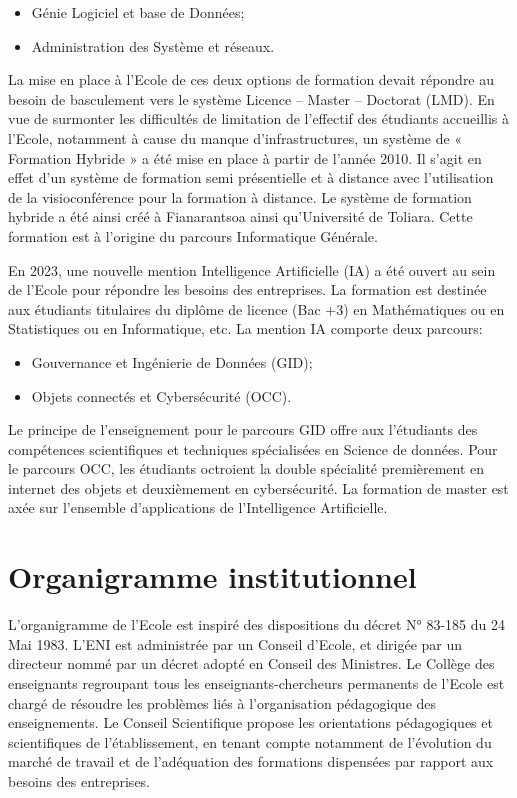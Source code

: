 \documentclass[12pt]{report}
\begin{document}
						\begin{itemize}
							\item Génie Logiciel et base de Données;
							\item Administration des Système et réseaux.
						\end{itemize}
				
				La mise en place à l’Ecole de ces deux options de formation devait répondre au besoin de basculement vers le système Licence – Master – Doctorat (LMD). 
En vue de surmonter les difficultés de limitation de l’effectif des étudiants accueillis à l’Ecole, notamment à cause du manque d’infrastructures, un système de « Formation Hybride » a été mise en place à partir de l’année 2010. Il s’agit en effet d’un système de formation semi présentielle et à distance avec l’utilisation de la visioconférence pour la formation à distance. Le système de formation hybride a été ainsi créé à Fianarantsoa ainsi qu’Université de Toliara. Cette formation est à l’origine du parcours Informatique Générale.

				En 2023, une nouvelle mention Intelligence Artificielle (IA) a été ouvert au sein de l’Ecole pour répondre les besoins des entreprises. La formation est destinée aux étudiants titulaires du diplôme de licence (Bac +3) en Mathématiques ou en Statistiques ou en Informatique, etc. La mention IA comporte deux parcours:

						\begin{itemize}
							\item Gouvernance et Ingénierie de Données (GID);
							\item Objets connectés et Cybersécurité (OCC).
						\end{itemize}

				Le principe de l’enseignement pour le parcours GID offre aux l’étudiants des compétences scientifiques et techniques spécialisées en Science de données. Pour le parcours OCC, les étudiants octroient la double spécialité premièrement en internet des objets et deuxièmement en cybersécurité. La formation de master est axée sur l’ensemble d’applications de l’Intelligence Artificielle.

				\section{Organigramme institutionnel}

				\hspace{15pt} L’organigramme de l’Ecole est inspiré des dispositions du décret N° 83-185 du 24 Mai 1983. L’ENI est administrée par un Conseil d’Ecole, et dirigée par un directeur nommé par un décret adopté en Conseil des Ministres. Le Collège des enseignants regroupant tous les enseignants-chercheurs permanents de l’Ecole est chargé de résoudre les problèmes liés à l’organisation pédagogique des enseignements. Le Conseil Scientifique propose les orientations pédagogiques et scientifiques de l’établissement, en tenant compte notamment de l’évolution du marché de travail et de l’adéquation des formations dispensées par rapport aux besoins des entreprises. 
\end{document}
